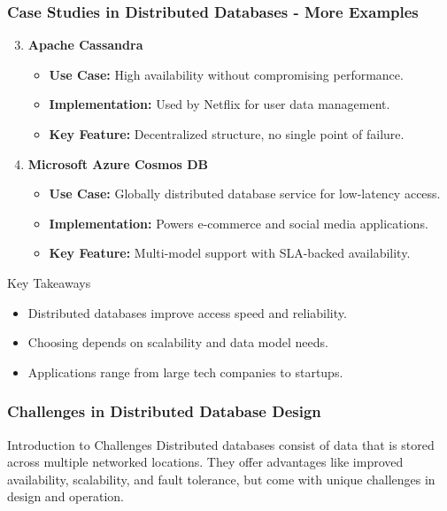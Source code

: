 \documentclass[aspectratio=169]{beamer}
\begin{document}
\begin{frame}[fragile]
    \frametitle{Case Studies in Distributed Databases - More Examples}
    \begin{enumerate}
        \setcounter{enumi}{2}  %
        \item \textbf{Apache Cassandra}
        \begin{itemize}
            \item \textbf{Use Case:} High availability without compromising performance.
            \item \textbf{Implementation:} Used by Netflix for user data management.
            \item \textbf{Key Feature:} Decentralized structure, no single point of failure.
        \end{itemize}

        \item \textbf{Microsoft Azure Cosmos DB}
        \begin{itemize}
            \item \textbf{Use Case:} Globally distributed database service for low-latency access.
            \item \textbf{Implementation:} Powers e-commerce and social media applications.
            \item \textbf{Key Feature:} Multi-model support with SLA-backed availability.
        \end{itemize}
    \end{enumerate}

    \begin{block}{Key Takeaways}
        \begin{itemize}
            \item Distributed databases improve access speed and reliability.
            \item Choosing depends on scalability and data model needs.
            \item Applications range from large tech companies to startups.
        \end{itemize}
    \end{block}
\end{frame}

\begin{frame}[fragile]
    \frametitle{Challenges in Distributed Database Design}
    \begin{block}{Introduction to Challenges}
        Distributed databases consist of data that is stored across multiple networked locations. They offer advantages like improved availability, scalability, and fault tolerance, but come with unique challenges in design and operation.
    \end{block}
\end{frame}
\end{document}
